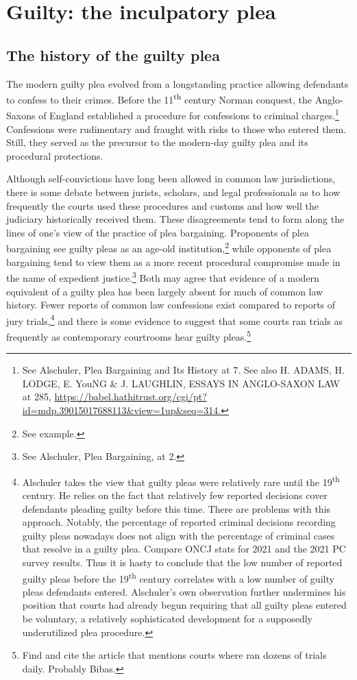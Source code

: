 \section{Guilty: the inculpatory plea}

\subsection{The history of the guilty plea}

The modern guilty plea evolved from a longstanding practice allowing defendants to confess to their crimes. Before the 11\textsuperscript{th} century Norman conquest, the Anglo-Saxons of England established a procedure for confessions to criminal charges.\footnote{See Alschuler, Plea Bargaining and Its History at 7. See also H. ADAMS, H. LODGE, E. YouNG \& J. LAUGHLIN, ESSAYS IN ANGLO-SAXON LAW at 285, \url{https://babel.hathitrust.org/cgi/pt?id=mdp.39015017688113\&view=1up\&seq=314.}} Confessions were rudimentary and fraught with risks to those who entered them. Still, they served as the precursor to the modern-day guilty plea and its procedural protections.

Although self-convictions have long been allowed in common law jurisdictions, there is some debate between jurists, scholars, and legal professionals as to how frequently the courts used these procedures and customs and how well the judiciary historically received them. These disagreements tend to form along the lines of one's view of the practice of plea bargaining. Proponents of plea bargaining see guilty pleas as an age-old institution,\footnote{See example.} while opponents of plea bargaining tend to view them as a more recent procedural compromise made in the name of expedient justice.\footnote{See Alschuler, Plea Bargaining, at 2.} Both may agree that evidence of a modern equivalent of a guilty plea has been largely absent for much of common law history. Fewer reports of common law confessions exist compared to reports of jury trials,\footnote{Alschuler takes the view that guilty pleas were relatively rare until the 19\textsuperscript{th} century. He relies on the fact that relatively few reported decisions cover defendants pleading guilty before this time. There are problems with this approach. Notably, the percentage of reported criminal decisions recording guilty pleas nowadays does not align with the percentage of criminal cases that resolve in a guilty plea. Compare ONCJ stats for 2021 and the 2021 PC survey results. Thus it is hasty to conclude that the low number of reported guilty pleas before the 19\textsuperscript{th} century correlates with a low number of guilty pleas defendants entered. Alschuler's own observation further undermines his position that courts had already begun requiring that all guilty pleas entered be voluntary, a relatively sophisticated development for a supposedly underutilized plea procedure.} and there is some evidence to suggest that some courts ran trials as frequently as contemporary courtrooms hear guilty pleas.\footnote{Find and cite the article that mentions courts where ran dozens of trials daily. Probably Bibas.} 

